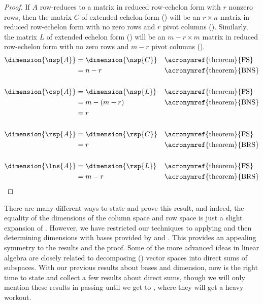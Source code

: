 %
\begin{proof}
If $A$ row-reduces to a matrix in reduced row-echelon form with $r$ nonzero rows, then the matrix $C$ of extended echelon form () will be an $r\times n$ matrix in reduced row-echelon form with no zero rows and $r$ pivot columns ().  Similarly, the matrix $L$ of extended echelon form () will be an $m-r\times m$ matrix in reduced row-echelon form with no zero rows and $m-r$ pivot columns ().
%
\begin{align*}
%
\dimension{\nsp{A}}
&=\dimension{\nsp{C}}&&\text{\acronymref{theorem}{FS}}\\
&=n-r&&\text{\acronymref{theorem}{BNS}}\\
\ \\
\dimension{\csp{A}}
&=\dimension{\nsp{L}}&&\text{\acronymref{theorem}{FS}}\\
&=m-(m-r)&&\text{\acronymref{theorem}{BNS}}\\
&=r\\
\ \\
\dimension{\rsp{A}}
&=\dimension{\rsp{C}}&&\text{\acronymref{theorem}{FS}}\\
&=r&&\text{\acronymref{theorem}{BRS}}\\
\ \\
\dimension{\lns{A}}
&=\dimension{\rsp{L}}&&\text{\acronymref{theorem}{FS}}\\
&=m-r&&\text{\acronymref{theorem}{BRS}}\\
\end{align*}
%
\end{proof}
%
There are many different ways to state and prove this result, and indeed, the equality of the dimensions of the column space and row space is just a slight expansion of .  However, we have restricted our techniques to applying  and then determining dimensions with bases provided by  and .  This provides an appealing symmetry to the results and the proof.
%
%
Some of the more advanced ideas in linear algebra are closely related to decomposing () vector spaces into direct sums of subspaces.  With our previous results about bases and dimension, now is the right time to state and collect a few results about direct sums, though we will only mention these results in passing until we get to , where they will get a heavy workout.\par

